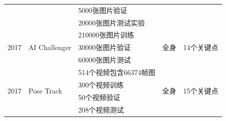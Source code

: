 \documentclass[hyperref]{ctexart}
\begin{document}
\begin{table}[H]
\begin{tabular}{lllll}
		&                                    & 5000张图片验证       &                      &                         \\
		&                                    & 20000张图片测试实验    &                      &                         \\ \hline
		\multirow{3}{*}{2017}                     & \multirow{3}{*}{AI Challenger}     & 210000张图片训练     & \multirow{3}{*}{全身}  & \multirow{3}{*}{14个关键点} \\
		&                                    & 30000张图片验证      &                      &                         \\
		&                                    & 60000张图片测试      &                      &                         \\ \hline
		\multirow{4}{*}{2017}                     & \multirow{4}{*}{Pose Track}        & 514个视频包含66374帧图 & \multirow{4}{*}{全身}  & \multirow{4}{*}{15个关键点} \\
		&                                    & 300个视频训练        &                      &                         \\
		&                                    & 50个视频验证         &                      &                         \\
		&                                    & 208个视频测试        &                      &                         \\ \hline
	\end{tabular}
	\label{table2}
\end{table}



\newpage




\end{document}

